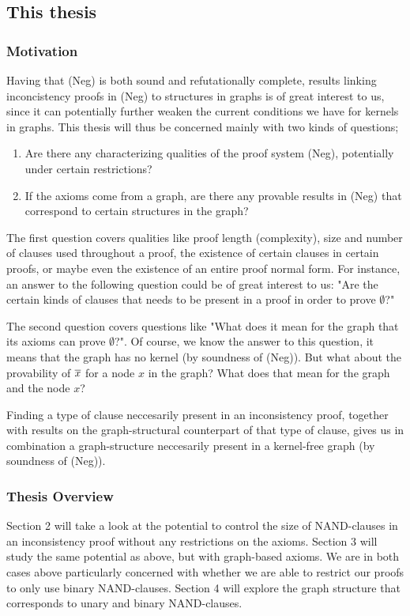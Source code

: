 \subsection{This thesis}
\label{sub:This thesis}
\subsubsection{Motivation}
\label{subs:Motivation}
Having that (Neg) is both sound and refutationally complete, results linking inconcistency proofs in (Neg) to structures in graphs is of great interest to us, since it can potentially further weaken the current conditions we have for kernels in graphs.
This thesis will thus be concerned mainly with two kinds of questions;
\begin{enumerate}
  \item Are there any characterizing qualities of the proof system (Neg), potentially under certain restrictions?
  \item If the axioms come from a graph, are there any provable results in (Neg) that correspond to certain structures in the graph?
\end{enumerate}
The first question covers qualities like proof length (complexity), size and number of clauses used throughout a proof, the existence of certain clauses in certain proofs, or maybe even the existence of an entire proof normal form.
For instance, an answer to the following question could be of great interest to us: "Are the certain kinds of clauses that needs to be present in a proof in order to prove $\emptyset$?"

The second question covers questions like "What does it mean for the graph that its axioms can prove $\emptyset$?".
Of course, we know the answer to this question, it means that the graph has no kernel (by soundness of (Neg)).
But what about the provability of $\overline{x}$ for a node $x$ in the graph?
What does that mean for the graph and the node $x$?

Finding a type of clause neccesarily present in an inconsistency proof, together with results on the graph-structural counterpart of that type of clause, gives us in combination a graph-structure neccesarily present in a kernel-free graph (by soundness of (Neg)).
\subsubsection{Thesis Overview}
\label{subs:Thesis Overview}
Section 2 will take a look at the potential to control the size of NAND-clauses in an inconsistency proof without any restrictions on the axioms.
Section 3 will study the same potential as above, but with graph-based axioms.
We are in both cases above particularly concerned with whether we are able to restrict our proofs to only use binary NAND-clauses.
Section 4 will explore the graph structure that corresponds to unary and binary NAND-clauses.
